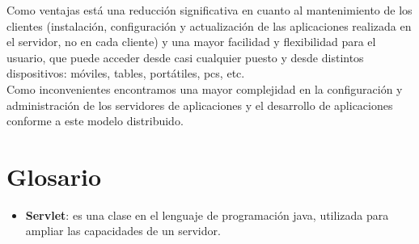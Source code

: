 \documentclass[a4paper,11pt]{article}
\begin{document}
Como ventajas está una reducción significativa en cuanto al mantenimiento de los clientes (instalación, configuración y actualización de las aplicaciones realizada en el servidor, no en cada cliente) y una mayor facilidad y flexibilidad para el usuario, que puede acceder desde casi cualquier puesto y desde distintos dispositivos: móviles, tables, portátiles, pcs, etc. \\

Como inconvenientes encontramos una mayor complejidad en la configuración y administración de los servidores de aplicaciones y el desarrollo de aplicaciones conforme a este modelo distribuido.

\section{Glosario}
\begin{itemize}
\item \textbf{Servlet}: es una clase en el lenguaje de programación java, utilizada para ampliar las capacidades de un servidor.
\end{itemize}
\end{document}
